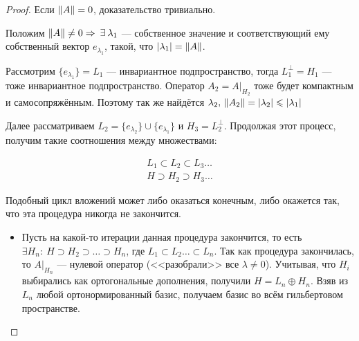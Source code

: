 \documentclass[12pt]{article}
\begin{document}
		\begin{proof}
			Если $\left\| A \right\| = 0$, доказательство тривиально.
		
			Положим $\norm{A} \neq 0 \Rightarrow \exists \lambda_1$ --- собственное значение и соответствующий ему 
			собственный вектор $e_{\lambda_1}$, такой, что $\left| \lambda_1 \right| = \left\| A \right\|$.
		
			Рассмотрим $\{e_{\lambda_1}\} = L_1$ --- инвариантное подпространство, тогда $L_1^{\perp} = H_1$ --- тоже инвариантное 
			подпространство. Оператор $A_2 = A|_{H_2}$ тоже будет компактным и самосопряжённым. Поэтому так же найдётся
			$\lambda_2,\, \left\| A_2 \right\| = \left| \lambda_2 \right| \leqslant \left| \lambda_1 \right|$
		
			Далее рассматриваем $L_2 = \{e_{\lambda_2}\} \cup \{e_{\lambda_1}\}$ и $H_3 = L_2^{\perp}$. Продолжая этот 
			процесс, получим такие соотношения между множествами:
		
			\begin{gather*}
				L_1 \subset L_2 \subset L_3 \dots \\
				H \supset H_2 \supset H_3 \dots
			\end{gather*}
		
			Подобный цикл вложений может либо оказаться конечным, либо окажется так, что эта процедура никогда не закончится.

			\begin{itemize}
			\item Пусть на какой-то итерации данная процедура закончится, то есть $\exists H_n:\: H \supset H_2 \supset \dots \supset H_n$,
				где $L_1 \subset L_2 \dots \subset L_n$. Так как процедура закончилась, то $A|_{H_n}$ --- нулевой оператор (<<разобрали>>
				все $\lambda \neq 0$). Учитывая, что $H_i$ выбирались как ортогональные дополнения, получили $H = L_n \oplus H_n$. 
				Взяв из $L_n$ любой ортонормированный базис, получаем базис во всём гильбертовом пространстве.
		

\end{itemize}
\end{proof}
\end{document}

